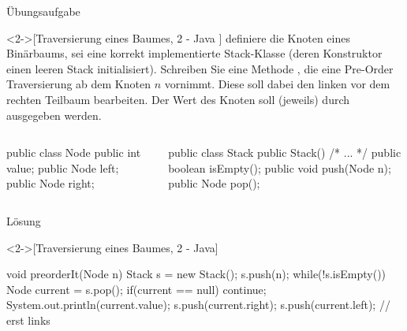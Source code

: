 \begin{frame}[fragile,c]{Übungsaufgabe}
    \begin{exercise}<2->[Traversierung eines Baumes, 2 - Java ]
         definiere die Knoten eines Binärbaums,  sei eine korrekt implementierte Stack-Klasse (deren Konstruktor einen leeren Stack initialisiert).\pause{} Schreiben Sie eine  Methode , die eine Pre-Order Traversierung ab dem Knoten \(n\) vornimmt. Diese soll dabei den linken vor dem rechten Teilbaum bearbeiten.\pause{} Der Wert des Knoten soll (jeweils) durch  ausgegeben werden.\pause{}
\begin{columns}[c]
%
\begin{column}{.42\linewidth}
\begin{plainjava}
public class Node {
    public int value;
    public Node left;
    public Node right;
}
\end{plainjava}
\end{column}
\begin{column}{.48\linewidth}
    \begin{plainjava}[morekeywords={[3]{Stack}}]
public class Stack {
    public Stack() {/* ... */}
    public boolean isEmpty();
    public void push(Node n);
    public Node pop();
}
\end{plainjava}
\end{column}
\end{columns}
    \end{exercise}
\end{frame}

\begin{frame}[fragile,c]{Lösung}
    \begin{solve}<2->[Traversierung eines Baumes, 2 - Java]
\pause{}\begin{plainjava}[morekeywords={[3]{Stack}}]
void preorderIt(Node n) {
    Stack s = new Stack();
    s.push(n);
    while(!s.isEmpty()) {
        Node current = s.pop();
        if(current == null)
            continue;
        System.out.println(current.value);
        s.push(current.right);
        s.push(current.left); // erst links
    }
}
\end{plainjava}
    \end{solve}
\end{frame}

